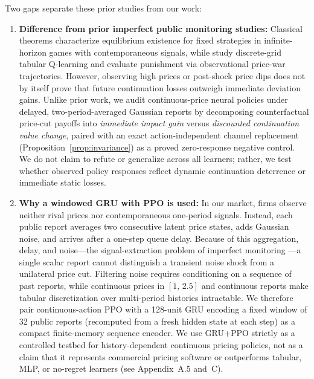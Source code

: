 \documentclass{article}
\begin{document}
Two gaps separate these prior studies from our work:
\begin{enumerate}
\item \textbf{Difference from prior imperfect public monitoring studies:} Classical theorems \citep{green1984noncooperative, abreu1990toward, fudenberg1994folk} characterize equilibrium existence for fixed strategies in infinite-horizon games with contemporaneous signals, while \citet{calvano2021algorithmic} study discrete-grid tabular Q-learning and evaluate punishment via observational price-war trajectories. However, observing high prices or post-shock price dips does not by itself prove that future continuation losses outweigh immediate deviation gains. Unlike prior work, we audit continuous-price neural policies under delayed, two-period-averaged Gaussian reports by decomposing counterfactual price-cut payoffs into \emph{immediate impact gain} versus \emph{discounted continuation value change}, paired with an exact action-independent channel replacement (Proposition~\ref{prop:invariance}) as a proved zero-response negative control. We do not claim to refute \citet{calvano2021algorithmic} or generalize across all learners; rather, we test whether observed policy responses reflect dynamic continuation deterrence or immediate static losses.
\item \textbf{Why a windowed GRU with PPO is used:} In our market, firms observe neither rival prices nor contemporaneous one-period signals. Instead, each public report averages two consecutive latent price states, adds Gaussian noise, and arrives after a one-step queue delay. Because of this aggregation, delay, and noise---the signal-extraction problem of imperfect monitoring \citep{green1984noncooperative, calvano2021algorithmic}---a single scalar report cannot distinguish a transient noise shock from a unilateral price cut. Filtering noise requires conditioning on a sequence of past reports, while continuous prices in $[1,\,2.5]$ and continuous reports make tabular discretization over multi-period histories intractable. We therefore pair continuous-action PPO \citep{schulman2017proximal} with a 128-unit GRU encoding a fixed window of 32 public reports (recomputed from a fresh hidden state at each step) as a compact finite-memory sequence encoder. We use GRU+PPO strictly as a controlled testbed for history-dependent continuous pricing policies, not as a claim that it represents commercial pricing software or outperforms tabular, MLP, or no-regret learners (see Appendix~A.5 and~C).
\end{enumerate}
\end{document}
